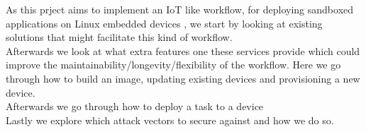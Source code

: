 \documentclass[../../main.tex]{subfiles}
\begin{document}
As this prject aims to implement an IoT like workflow, for deploying sandboxed applications
on Linux embedded devices , we start by looking at existing solutions that might
facilitate this kind of workflow.\\

Afterwards we look at what extra features one these services provide which could improve
the maintainability/longevity/flexibility of the workflow.
Here we go through how to build an image, updating existing devices and provisioning a new
device.\\

Afterwards we go through how to deploy a task to a device\\

Lastly we explore which attack vectors to secure against and how we do so.



	
\end{document}
